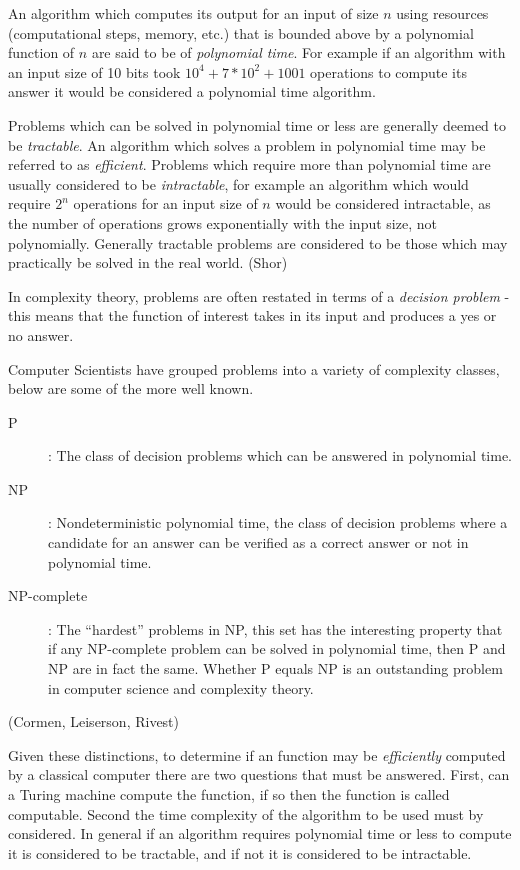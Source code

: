 \documentclass[]{article}
\begin{document}
An algorithm which computes its output for an input of size $n$ using
resources (computational steps, memory, etc.) that is bounded above by
a polynomial function of $n$ are said to be of \emph{polynomial
  time}. For example if an algorithm with an input size of 10 bits
took $10^{4} + 7*10^{2} + 1001$ operations to compute its answer it would
be considered a polynomial time algorithm.

Problems which can be solved in polynomial time or less are generally
deemed to be \emph{tractable}.  An algorithm which solves a problem in
polynomial time may be referred to as \emph{efficient}.  Problems which
require more than polynomial time are usually considered to be
\emph{intractable}, for example an algorithm which would require $2^{n}$
operations for an input size of $n$ would be considered intractable,
as the number of operations grows exponentially with the input size,
not polynomially.  Generally tractable problems are considered to be
those which may practically be solved in the real world.  (Shor)

In complexity theory, problems are often restated in terms of a
\emph{decision problem} - this means that the function of interest
takes in its input and produces a yes or no answer.

Computer Scientists have grouped problems into a variety of complexity
classes, below are some of the more well known.

\begin{description}
\item[P]: The class of decision problems which can be answered in
  polynomial time.

\item[NP]: Nondeterministic polynomial time, the class of decision
  problems where a candidate for an answer can be verified as a
  correct answer or not in polynomial time.

\item[NP-complete]: The ``hardest'' problems in NP, this set has the
  interesting property that if any NP-complete problem can be solved
  in polynomial time, then P and NP are in fact the same.  Whether P
  equals NP is an outstanding problem in computer science and complexity theory.
\end{description}
(Cormen, Leiserson, Rivest)

Given these distinctions, to determine if an function may be
\emph{efficiently} computed by a classical computer there are two
questions that must be answered.  First, can a Turing machine compute
the function, if so then the function is called computable.  Second
the time complexity of the algorithm to be used must by considered.
In general if an algorithm requires polynomial time or less to compute
it is considered to be tractable, and if not it is considered to be
intractable.
\end{document}
